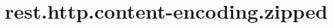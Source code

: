 \section{rest.http.content-encoding.zipped}
\label{configuration:RestHttpContentEncodingZipped}
\AvailableInCsharpOnly{\TODO}